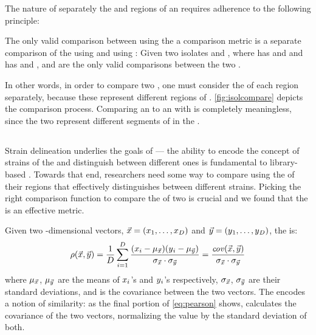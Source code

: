 The nature of separately \pyroing{} the \Ssixt{} and \Sfive{} regions of an \isol{} requires adherence to the following principle:

\begin{principle}\label{principle:comparing-isolates}
The only valid comparison between \isols{} using the a comparison metric \pcfunclabel{} is a separate comparison of the \Ssixt{} \pyros{} using \pcfunclabel{} and \Sfive{} \pyros{} using \pcfunclabel{}:
Given two isolates \isola{} and \isolb{}, where 
\isola{} has \pyros{} \isolasixt{} and \isolafive{}
and
\isolb{} has \pyros{} \isolbsixt{} and \isolbfive{},
\pcisolsixt{}
and
\pcisolfive{}
are the only valid comparisons between the two \isols{}.
\end{principle}
\index{\pearson{}}
\index{\pcfunclabel{}}

\noindent 
In other words, in order to compare two \isols{}, one must consider the \pyros{} of each \itsshort{} region separately, because these \pyros{} represent different regions of \dna{}.
\autoref{fig:isolcompare} depicts the comparison process.
Comparing an \Ssixt{} \pyro{} to an \Sfive{} \pyro{} with \pcfunclabel{} is completely meaningless, since the two \pyros{} represent different segments of \dna{} in the \ecoli{}.

\subsection{\Pearson{}}
Strain delineation underlies the goals of \cplop{} --- the ability to encode the concept of strains of the \fib{} \ecoli{} and distinguish between different ones is fundamental to library-based \mst{}.
Towards that end, \cplop{} researchers need some way to compare \isols{} using the \pyros{} of their \itsshort{} regions that effectively distinguishes between different strains.
Picking the right comparison function to compare the \pyros{} of two \isols{} is crucial and we found that the \Pearson{} is an effective metric.

Given two \numdims{}-dimensional vectors, $\vec{x}{}=(x{}_1,\dots,x{}_{D})$ and $\vec{y}{}=(y{}_1,\dots,y{}_{D})$, the \pearson{}
\pcfunclabel{} is:
\begin{equation}\label{eq:pearson}
    \rho{}(\vec{x{}}, \vec{y{}})
    =
     \frac{1}{D{}}\sum_{i=1}^{D}{}\frac{(x{}_i - \mu_{\vec{x{}}})(y{}_i - \mu_{\vec{y{}}})}{\sigma_{\vec{x{}}}\cdot \sigma_{\vec{y{}}}} 
    =
    \frac{\mathit{cov}(\vec{x{}}, \vec{y{}})}{\sigma_{\vec{x{}}}\cdot\sigma_{\vec{y}}}
\end{equation}
where $\mu_{\vec{x}{}}$, $\mu_{\vec{y}{}}$ are the means of $x{}_i$'s and $y{}_i$'s respectively,
$\sigma_{\vec{x{}}}$, $\sigma_{\vec{y{}}}$ are their standard deviations,
and \veccov{\pca{}}{\pcb{}} is the covariance between the two vectors.
\index{\pearson{}}
\index{\pcfunclabel{}}
\index{\pcshort{}}
The \pearson{} encodes a notion of similarity:
as the final portion of \autoref{eq:pearson} shows, \pcshort{} calculates the covariance of the two vectors, normalizing the value by the standard deviation of both.

